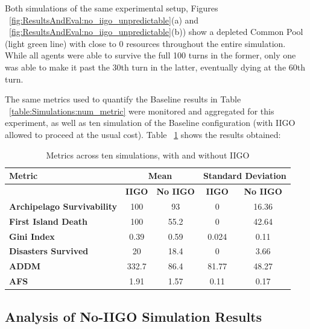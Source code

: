 Both simulations of the same experimental setup, Figures ~\ref{fig:ResultsAndEval:no_iigo_unpredictable}(a) and ~\ref{fig:ResultsAndEval:no_iigo_unpredictable}(b)) show a depleted Common Pool (light green line) with close to 0 resources throughout the entire simulation. While all agents were able to survive the full 100 turns in the former, only one was able to make it past the 30th turn in the latter, eventually dying at the 60th turn. 

The same metrics used to quantify the Baseline results in Table ~\ref{table:Simulations:num_metric} were monitored and aggregated for this experiment, as well as ten simulation of the Baseline configuration (with IIGO allowed to proceed at the usual cost). Table ~\ref{table:ResultsAndEval:iigo_vs_no_iigo} shows the results obtained:

\begin{table}[h]
    \centering
    \begin{tabular}{|l|c|c|c|c|}
    \hline
    \textbf{Metric}                     & \multicolumn{2}{c}{\textbf{Mean}}    & \multicolumn{2}{c}{\textbf{Standard Deviation}}   \\ \hline
                                        & \textbf{IIGO}      & \textbf{No IIGO}      &\textbf{IIGO}       & \textbf{No IIGO}                 \\ 
    \textbf{Archipelago Survivability}  & 100 & 93 & 0 & 16.36     \\
    \textbf{First Island Death}         & 100 & 55.2 & 0 & 42.64    \\
    \textbf{Gini Index}                 & 0.39 & 0.59 & 0.024 & 0.11   \\
    \textbf{Disasters Survived}         & 20 & 18.4 & 0 & 3.66    \\
    \textbf{ADDM}                       & 332.7 & 86.4 & 81.77 & 48.27    \\
    \textbf{AFS}                        & 1.91 & 1.57 & 0.11 & 0.17    \\ \hline
\end{tabular}
\caption{Metrics across ten simulations, with and without IIGO}
\label{table:ResultsAndEval:iigo_vs_no_iigo}
\end{table}


\subsection{Analysis of No-IIGO Simulation Results}
\label{subsec:ResultsAndEval:no-iigo:analysis_non_iigo_results}


